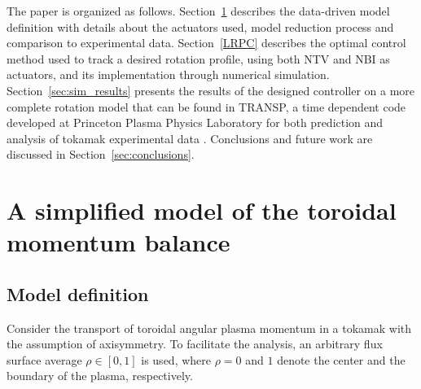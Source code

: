 \documentclass[12pt,lot, lof]{puthesis}
\begin{document}
The paper is organized as follows.  Section~\ref{MHW} describes the data-driven model
definition with details about the actuators used, model reduction process and
comparison to experimental data. Section~\ref{LRPC} describes the optimal
control method used to track a desired rotation profile, using both NTV and NBI
as actuators, and its implementation through numerical simulation. Section~\ref{sec:sim_results}
presents the results of the designed controller on a more complete rotation
model that can be found in TRANSP, a time dependent code developed at Princeton
Plasma Physics Laboratory for both prediction and analysis of tokamak
experimental data \cite{Goldston81, Budny94}. Conclusions and future work are
discussed in Section~\ref{sec:conclusions}.


 \section{A simplified model of  the toroidal momentum balance }
 \label{MHW}
 
\subsection{Model definition}
Consider the transport of toroidal angular plasma momentum in a tokamak with the assumption of axisymmetry.  To facilitate the analysis, an arbitrary flux surface average $\rho \in [0,1]$ is used, where $\rho = 0$ and $1$ denote the center and the boundary of the plasma, respectively.  
\end{document}
